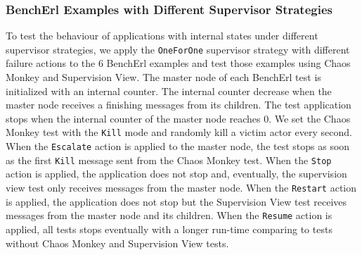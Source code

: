 \subsubsection{BenchErl Examples with Different Supervisor Strategies}
\label{bencherl_chaos_test}

To test the behaviour of applications with internal states under 
different supervisor strategies, we apply the {\tt OneForOne} supervisor 
strategy with different failure actions to the 6 BenchErl examples and test 
those examples using Chaos Monkey and Supervision View.  The master node of 
each BenchErl test is initialized with an internal counter.  The internal 
counter decrease when the master node receives a finishing messages from its 
children.  The test application stops when the internal counter of the master 
node reaches 0.  We set the Chaos Monkey test with the {\tt Kill} mode and 
randomly kill a victim actor every second.  When the {\tt Escalate} action is 
applied to the master node, the test stops as soon as the first {\tt Kill} 
message sent from the Chaos Monkey test.  When the {\tt Stop} action is applied, 
the application does not stop and, eventually, the supervision view test only 
receives messages from the master node.  When the {\tt Restart} action is 
applied, the application does not stop but the Supervision View test receives 
messages from the master node and its children.  When the {\tt Resume} action is 
applied, all tests stops eventually with a longer run-time comparing to tests 
without Chaos Monkey and Supervision View tests.


